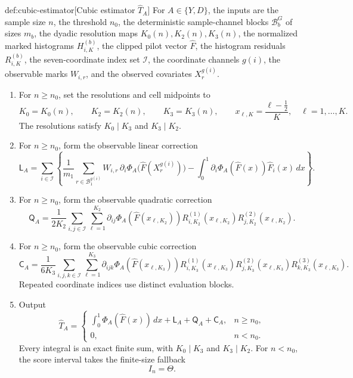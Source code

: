 \begin{algorithmv}{def:cubic-estimator}[Cubic estimator \(\widehat T_A\)]
For \(A\in\{Y,D\}\), the inputs are the sample size \(n\), the threshold \(n_0\), the deterministic sample-channel blocks \(\mathcal B_b^G\) of sizes \(m_b\), the dyadic resolution maps \(K_0(n),K_2(n),K_3(n)\), the normalized marked histograms \(H_{i,K}^{(b)}\), the clipped pilot vector \(\widehat F\), the histogram residuals \(R_{i,K}^{(b)}\), the seven-coordinate index set \(\mathcal I\), the coordinate channels \(g(i)\), the observable marks \(W_{i,r}\), and the observed covariates \(X_r^{g(i)}\).
\begin{enumerate}
\item For \(n\ge n_0\), set the resolutions and cell midpoints to
\[
K_0=K_0(n),\qquad K_2=K_2(n),\qquad K_3=K_3(n),
\qquad
x_{\ell,K}=\frac{\ell-\tfrac12}{K},
\quad \ell=1,\ldots,K.
\]
The resolutions satisfy \(K_0\mid K_3\) and \(K_3\mid K_2\).

\item For \(n\ge n_0\), form the observable linear correction
\[
\mathsf L_A=
\sum_{i\in\mathcal I}
\left\{
\frac{1}{m_1}
\sum_{r\in\mathcal B_1^{g(i)}}
W_{i,r}\,\partial_i\Phi_A
\bigl(\widehat F(X_r^{g(i)})\bigr)
-
\int_0^1
\partial_i\Phi_A(\widehat F(x))\widehat F_i(x)\,dx
\right\}.
\]

\item For \(n\ge n_0\), form the observable quadratic correction
\[
\mathsf Q_A=
\frac{1}{2K_2}
\sum_{i,j\in\mathcal I}\sum_{\ell=1}^{K_2}
\partial_{ij}\Phi_A(\widehat F(x_{\ell,K_2}))
R_{i,K_2}^{(1)}(x_{\ell,K_2})
R_{j,K_2}^{(2)}(x_{\ell,K_2}).
\]

\item For \(n\ge n_0\), form the observable cubic correction
\[
\mathsf C_A=
\frac{1}{6K_3}
\sum_{i,j,k\in\mathcal I}\sum_{\ell=1}^{K_3}
\partial_{ijk}\Phi_A(\widehat F(x_{\ell,K_3}))
R_{i,K_3}^{(1)}(x_{\ell,K_3})
R_{j,K_3}^{(2)}(x_{\ell,K_3})
R_{k,K_3}^{(3)}(x_{\ell,K_3}).
\]
Repeated coordinate indices use distinct evaluation blocks.

\item Output
\[
\widehat T_A=
\begin{cases}
\displaystyle
\int_0^1\Phi_A(\widehat F(x))\,dx+
\mathsf L_A+\mathsf Q_A+\mathsf C_A,
& n\ge n_0,\\
0,& n<n_0.
\end{cases}
\]
Every integral is an exact finite sum, with \(K_0\mid K_3\) and \(K_3\mid K_2\). For \(n<n_0\), the score interval takes the finite-size fallback
\[
I_n=\Theta.
\]
\end{enumerate}
\end{algorithmv}

